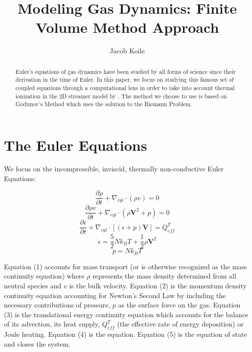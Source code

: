 \documentclass[]{article}
\title{Modeling Gas Dynamics: Finite Volume Method Approach}
\author{Jacob Koile}
\begin{document}
\maketitle

\begin{abstract}
	Euler's equations of gas dynamics have been studied by all forms of science since their derivation in the time of Euler. In this paper, we focus on studying this famous set of coupled equations through a computational lens in order to take into account thermal ionization in the 2D streamer model by \citet{Liu:2004b}. The method we choose to use is based on Godunov's Method which uses the solution to the Riemann Problem. 

\end{abstract}

\section{The Euler Equations}

	We focus on the incompressible, inviscid, thermally non-conductive Euler Equations:

	\begin{equation}
	\frac{\partial\rho}{\partial t} + \nabla_{cyl} \cdot (\rho v) = 0
	\end{equation} 
	\begin{equation}
	\frac{\partial \rho v}{\partial t} + \nabla_{cyl} \cdot (\rho \textbf{V}^2 + p) = 0   
	\end{equation}
	\begin{equation}
	\frac{\partial \epsilon}{\partial t} + \nabla_{cyl} \cdot [(\epsilon + p)\textbf{V}] = Q_{eff}^T  
	\end{equation}	 
	\begin{equation}
	\epsilon = \frac{5}{2} N k_B T + \frac{1}{2}\rho \textbf{V}^2 
	\end{equation}
	\begin{equation}
	p = N k_B T
	\end{equation}

	Equation (1) accounts for mass transport (or is otherwise recognized as the mass continuity equation) where $\rho$ represents the mass density determined from all neutral species and $v$ is the bulk velocity. Equation (2) is the momentum density continuity equation accounting for Newton's Second Law by including the necessary contributions of pressure, $p$ as the surface force on the gas. Equation (3) is the translational energy continuity equation which accounts for the balance of its advection, its heat supply, $Q_{eff}^T$ (the effective rate of energy deposition) or Joule heating. Equation (4) is the equation. Equation (5) is the equation of state and closes the system.
	
\end{document}
